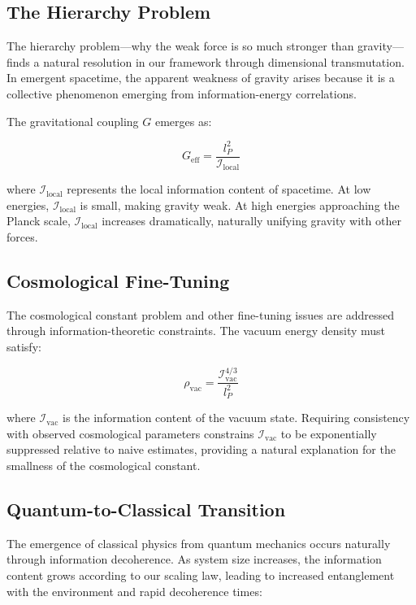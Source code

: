 \documentclass[11pt,a4paper]{article}
\begin{document}
\subsection{The Hierarchy Problem}

The hierarchy problem—why the weak force is so much stronger than gravity—finds a natural resolution in our framework through dimensional transmutation. In emergent spacetime, the apparent weakness of gravity arises because it is a collective phenomenon emerging from information-energy correlations.

The gravitational coupling $G$ emerges as:

\begin{equation}
G_{\text{eff}} = \frac{l_P^2}{\mathcal{I}_{\text{local}}}
\end{equation}

where $\mathcal{I}_{\text{local}}$ represents the local information content of spacetime. At low energies, $\mathcal{I}_{\text{local}}$ is small, making gravity weak. At high energies approaching the Planck scale, $\mathcal{I}_{\text{local}}$ increases dramatically, naturally unifying gravity with other forces.

\subsection{Cosmological Fine-Tuning}

The cosmological constant problem and other fine-tuning issues are addressed through information-theoretic constraints. The vacuum energy density must satisfy:

\begin{equation}
\rho_{\text{vac}} = \frac{\mathcal{I}_{\text{vac}}^{4/3}}{l_P^2}
\end{equation}

where $\mathcal{I}_{\text{vac}}$ is the information content of the vacuum state. Requiring consistency with observed cosmological parameters constrains $\mathcal{I}_{\text{vac}}$ to be exponentially suppressed relative to naive estimates, providing a natural explanation for the smallness of the cosmological constant.

\subsection{Quantum-to-Classical Transition}

The emergence of classical physics from quantum mechanics occurs naturally through information decoherence. As system size increases, the information content grows according to our scaling law, leading to increased entanglement with the environment and rapid decoherence times:
\end{document}
